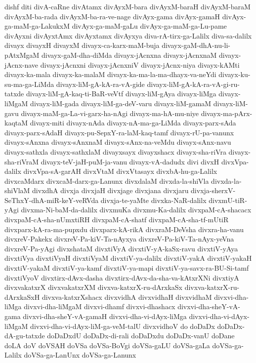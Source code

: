{dishf
diti
divA-caRne
divAtamx
divAyxM-bara
divAyxM-baraH
divAyxM-baraM
divAyxM-ba-rada
divAyxM-ba-ra-ve-nage
divAyx-gama
divAyx-gamaH
divAyx-ga-maM-ga-LakukxM
divAyx-ga-maM-gaLu
divAyx-ga-maM-ga-Lu-pame
divAyxni
divAyxtAmx
divAyxtamx
divAyxya
diva-rA-tirx-ga-Lalilx
diva-sa-dalilx
divayx
divayxH
divayxM
divayx-ca-karx-maM-buja
divayx-gaM-dhA-nu-li-pAtxMgaM
divayx-gaM-dha-diMda
divayx-jAcnxna
divayx-jAcnxnaM
divayx-jAcnx-nave
divayx-jAcnxni
divayx-jAcnxniV
divayx-jAcnx-niya
divayx-kAMti
divayx-ka-mala
divayx-ka-malaM
divayx-ka-ma-la-ma-dhayx-va-neYdi
divayx-ku-su-ma-ga-LiMda
divayx-liM-gA-kA-ra-vA-gide
divayx-liM-gA-kA-ra-vA-gi-ru-tatxde
divayx-liM-gA-kaq-ti-BaR-veVtf
divayx-liM-gAya
divayx-liMga
divayx-liMgaM
divayx-liM-gada
divayx-liM-ga-deV-varu
divayx-liM-gamaM
divayx-liM-gavu
divayx-maM-ga-La-vi-garx-ha-nAgi
divayx-ma-hA-mu-niye
divayx-ma-pArx-kaqtaM
divayx-miti
divayx-nAda
divayx-nA-ma-ga-LiMda
divayx-parx-sAda
divayx-parx-sAdaH
divayx-pu-SepxY-ra-laM-kaq-tamf
divayx-rU-pa-vanunx
divayx-sAnxna
divayx-sAnxnaM
divayx-sAnx-na-veMdu
divayx-sAnx-navu
divayx-sathxla
divayx-sathxlaM
divayxsayx
divayxshacx
divayx-sha-riVra
divayx-sha-riVraM
divayx-teV-jaH-puM-ja-vanu
divayx-vA-dadudx
divi
divxH
divxVpa-dalilx
divxVpa-sA-garAH
divxVtaM
divxVtasayx
divxbA-hu-ga-Lalilx
divxcaMdarx
divxcaM-darx-ga-Lanunx
divxdalaM
divxda-la-shiVla
divxda-la-shiVlaM
divxdhA
divxja
divxjaH
divxjage
divxjana
divxjaru
divxja-sherxV-SeThxY-dhA-miR-keY-veRVda
divxja-te-yaMte
divxka-NaR-dalilx
divxmU-tiR-yAgi
divxma-Ni-baM-da-dalilx
divxmuKa
divxmu-Ka-dalilx
divxpaM-cA-shacacx
divxpaM-cA-sha-nUmxtiRH
divxpaM-cA-shatf
divxpaM-cA-sha-tf-mUtiR
divxparx-kA-ra-ma-pupxdu
divxparx-kA-rikA
divxraM-DeVsha
divxra-ha-vanu
divxreV-Pakekx
divxreV-Pa-kiV-Ta-nAyxya
divxreV-Pa-kiV-Ta-nAyx-yeVna
divxreV-Pa-yAgi
divxshataM
divxtiVyA
divxtiV-yA-kaSx-ravu
divxtiV-yAya
divxtiVya
divxtiVyaH
divxtiVyaM
divxtiV-ya-dalilx
divxtiV-yakA
divxtiV-yakaH
divxtiV-yakaM
divxtiV-ya-kamf
divxtiV-ya-mapi
divxtiV-ya-savx-ra-BU-Si-tamf
divxtiVyoV
divxtirx-dAvx-dasha
divxtirx-dAvx-da-sha-va-kAtxrXNi
divxtiyA
divxvakatxrX
divxvakatxrXM
divxva-katxrX-ru-dArxkaSx
divxva-katxrX-ru-dArxkaSxH
divxva-katxrXshacx
divxvidhA
divxvidhaH
divxvidhaM
divxvi-dha-liMga
divxvi-dha-liMgaM
divxvi-dhamf
divxvi-dhashacx
divxvi-dha-sheY-vA-gama
divxvi-dha-sheY-vA-gamaH
divxvi-dha-vi-dAyx-liMga
divxvi-dha-vi-dAyx-liMgaM
divxvi-dha-vi-dAyx-liM-ga-veM-talU
divxvidhoV
do
doDaDx
doDaDx-dA-gu-tatxde
doDaDxdU
doDaDx-di-rali
doDaDxdu
doDaDx-vanU
doDane
doLA
doV
doVSAH
doVSa
doVSa-BoVgi
doVSa-gaLU
doVSa-gaLa
doVSa-ga-Lalilx
doVSa-ga-LanUnx
doVSa-ga-Lanunx
}
